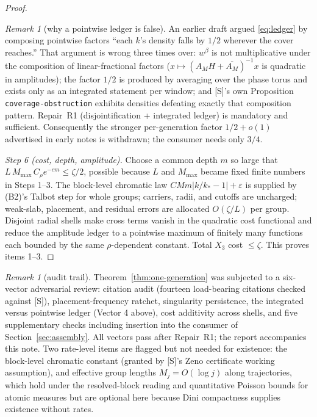 \documentclass[11pt]{article}
\theoremstyle{remark}
\newtheorem{remark}[theorem]{Remark}
\theoremstyle{definition}
\begin{document}
\begin{proof}
\begin{remark}[why a pointwise ledger is false]
An earlier draft argued \eqref{eq:ledger} by composing pointwise factors
``each $k$'s density falls by $1/2$ wherever the cover reaches.''  That
argument is wrong three times over: $w^\beta$ is not multiplicative under the
composition of linear-fractional factors ($x\mapsto(A_MH+\overline{A_M})^{-1}x$
is quadratic in amplitudes); the factor $1/2$ is produced by averaging over
the phase torus and exists only as an integrated statement per window; and
[S]'s own Proposition \texttt{coverage-obstruction} exhibits densities
defeating exactly that composition pattern.  Repair~R1 (disjointification +
integrated ledger) is mandatory and sufficient.  Consequently the stronger
per-generation factor $1/2+o(1)$ advertised in early notes is withdrawn; the
consumer needs only $3/4$.
\end{remark}

\emph{Step 6 (cost, depth, amplitude).}
Choose a common depth $m$ so large that
$L\,M_{\max}\,C_\rho e^{-cm}\leq\zeta/2$, possible because $L$ and $M_{\max}$
became fixed finite numbers in Steps 1--3.  The block-level chromatic law
$CMm|k/k_\ast-1|+\varepsilon$ is supplied by (B2)'s Talbot step for whole
groups; carriers, radii, and cutoffs are uncharged; weak-slab, placement, and
residual errors are allocated $O(\zeta/L)$ per group.  Disjoint radial shells
make cross terms vanish in the quadratic cost functional and reduce the
amplitude ledger to a pointwise maximum of finitely many functions each
bounded by the same $\rho$-dependent constant.  Total $X_3$ cost
$\leq\zeta$.  This proves items 1--3.
\end{proof}

\begin{remark}[audit trail]
\label{rem:audit}
Theorem~\ref{thm:one-generation} was subjected to a six-vector adversarial
review: citation audit (fourteen load-bearing citations checked against [S]),
placement-frequency ratchet, singularity persistence, the integrated versus
pointwise ledger (Vector 4 above), cost additivity across shells, and five
supplementary checks including insertion into the consumer of Section~\ref{sec:assembly}.
All vectors pass after Repair~R1; the report accompanies this note.  Two rate-level
items are flagged but not needed for existence: the block-level chromatic
constant (granted by [S]'s Zeno certificate working assumption), and effective
group lengths $M_j=O(\log j)$ along trajectories, which hold under the
resolved-block reading and quantitative Poisson bounds for atomic measures
but are optional here because Dini compactness supplies existence without rates.
\end{remark}
\end{document}
